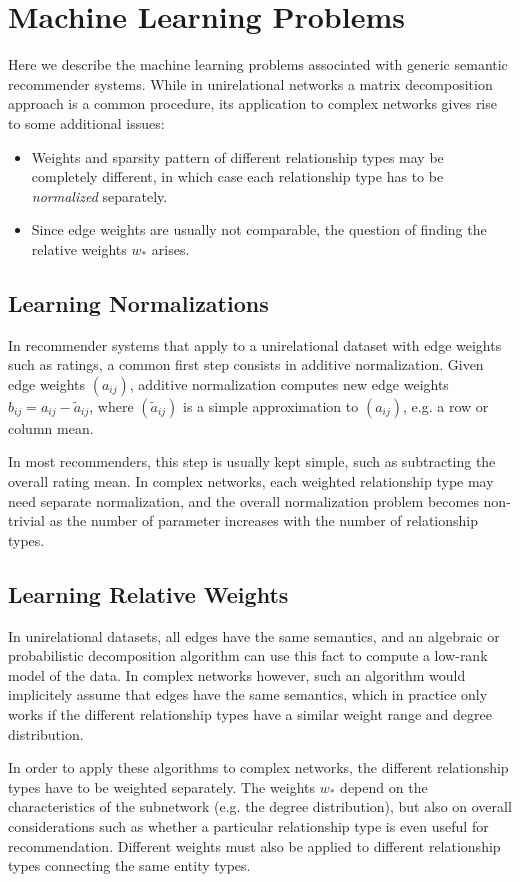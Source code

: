\documentclass{article}
\begin{document}
\section{Machine Learning Problems}
Here we describe the machine learning problems
associated with generic semantic recommender systems. 
While in unirelational networks a matrix decomposition approach is a
common procedure, its application to complex networks gives rise to some
additional issues:
\begin{itemize}
\item Weights and sparsity pattern of different relationship types may
  be completely different, in which case each relationship type has to
  be \emph{normalized} separately.
\item Since edge weights are usually not comparable, the question of
  finding the relative weights $w_*$ arises. 
\end{itemize}

\subsection{Learning Normalizations}
In recommender systems that apply to a unirelational dataset with edge
weights such as ratings, a common first step consists in additive
normalization.  Given edge weights $(a_{ij})$, additive normalization
computes new edge weights $b_{ij} = a_{ij} - \tilde a_{ij}$, where
$(\tilde a_{ij})$ is a simple approximation to $(a_{ij})$, e.g. a row or
column mean. 

In most recommenders, this step is usually kept simple, such as
subtracting the overall rating mean.  In complex networks, each weighted
relationship type may need separate normalization, and the overall
normalization problem becomes non-trivial as the number of parameter
increases with the number of relationship types. 

\subsection{Learning Relative Weights}
In unirelational datasets, all edges have the same semantics, and an
algebraic or probabilistic decomposition algorithm can use this fact to
compute a low-rank model of the data.  In complex networks however, such
an algorithm would implicitely assume that edges have the same
semantics, which in practice only works if the different relationship
types have a similar weight range and degree distribution.  

In order to apply these algorithms to complex networks, the different relationship types
have to be weighted separately.  The weights $w_*$ depend on the
characteristics of the subnetwork (e.g. the degree distribution), but
also on overall considerations such as whether a particular relationship
type is even useful for recommendation.  Different weights must also be
applied to different relationship types connecting the same entity
types.  
\end{document}
